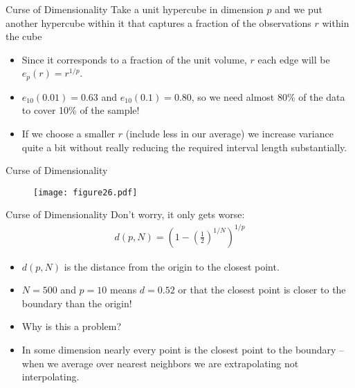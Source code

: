 \documentclass[11pt,handout,xcolor=pdftex,dvipsnames,table,mathserif]{beamer}
\begin{document}
\begin{frame}{Curse of Dimensionality}
Take a unit hypercube in dimension $p$ and we put another hypercube within it that captures a fraction of the observations $r$ within the cube
\begin{itemize}
\item Since it corresponds to a fraction of the unit volume, $r$ each edge  will be $e_p(r) = r^{1/p}$.
\item $e_{10}(0.01) = 0.63$ and $e_{10}(0.1) = 0.80$, so we need almost 80\% of the data to cover 10\% of the sample!
\item If we choose a smaller $r$ (include less in our average) we increase variance quite a bit without really reducing the required interval length substantially.
\end{itemize}
\end{frame}

\begin{frame}{Curse of Dimensionality}
\begin{figure}[htbp]
\begin{center}
\texttt{[image: figure26.pdf]}
\label{class15nn}
\end{center}
\end{figure}
\end{frame}

\begin{frame}{Curse of Dimensionality}
Don't worry, it only gets worse:
\begin{eqnarray*}
d(p,N) = \left(1-\left(\frac{1}{2} \right)^{1/N} \right)^{1/p}
\end{eqnarray*}

\begin{itemize}
\item $d(p,N)$ is the distance from the origin to the closest point.
\item $N=500$ and $p=10$ means $d = 0.52$ or that the closest point is closer to the boundary than the origin!
\item Why is this a problem?
\item In some dimension nearly every point is the closest point to the boundary -- when we average over nearest neighbors we are \alert{extrapolating} not \alert{interpolating}.
\end{itemize}
\end{frame}
\end{document}
